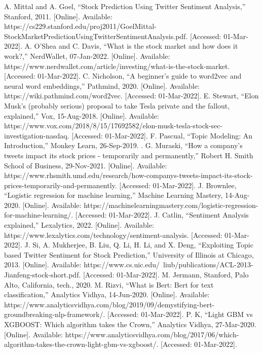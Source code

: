 \documentclass[conference]{IEEEtran}
\begin{document}
\begin{thebibliography}{00}
     A. Mittal and A. Goel, “Stock Prediction Using Twitter Sentiment Analysis,” Stanford, 2011. [Online]. Available: https://cs229.stanford.edu/proj2011/GoelMittal-StockMarketPredictionUsingTwitterSentimentAnalysis.pdf. [Accessed: 01-Mar-2022].
     A. O'Shea and C. Davis, “What is the stock market and how does it work?,” NerdWallet, 07-Jan-2022. [Online]. Available: https://www.nerdwallet.com/article/investing/what-is-the-stock-market. [Accessed: 01-Mar-2022].
     C. Nicholson, “A beginner's guide to word2vec and neural word embeddings,” Pathmind, 2020. [Online]. Available: https://wiki.pathmind.com/word2vec. [Accessed: 01-Mar-2022].
     E. Stewart, “Elon Musk's (probably serious) proposal to take Tesla private and the fallout, explained,” Vox, 15-Aug-2018. [Online]. Available: https://www.vox.com/2018/8/15/17692582/elon-musk-tesla-stock-sec-investigation-nasdaq. [Accessed: 01-Mar-2022].
     F. Pascual, “Topic Modeling: An Introduction,” Monkey Learn, 26-Sep-2019. .
     G. Muraski, “How a company's tweets impact its stock prices - temporarily and permanently,” Robert H. Smith School of Business, 29-Nov-2021. [Online]. Available: https://www.rhsmith.umd.edu/research/how-companys-tweets-impact-its-stock-prices-temporarily-and-permanently. [Accessed: 01-Mar-2022].
     J. Brownlee, “Logistic regression for machine learning,” Machine Learning Mastery, 14-Aug-2020. [Online]. Available: https://machinelearningmastery.com/logistic-regression-for-machine-learning/. [Accessed: 01-Mar-2022].
     J. Catlin, “Sentiment Analysis explained,” Lexalytics, 2022. [Online]. Available: https://www.lexalytics.com/technology/sentiment-analysis. [Accessed: 01-Mar-2022].
     J. Si, A. Mukherjee, B. Liu, Q. Li, H. Li, and X. Deng, “Exploiting Topic based Twitter Sentiment for Stock Prediction,” University of Illinois at Chicago, 2013. [Online]. Available: https://www.cs.uic.edu/~liub/publications/ACL-2013-Jianfeng-stock-short.pdf. [Accessed: 01-Mar-2022].
     M. Jermann, Stanford, Palo Alto, California, tech., 2020.
     M. Rizvi, “What is Bert: Bert for text classification,” Analytics Vidhya, 14-Jun-2020. [Online]. Available: https://www.analyticsvidhya.com/blog/2019/09/demystifying-bert-groundbreaking-nlp-framework/. [Accessed: 01-Mar-2022].
     P. K, “Light GBM vs XGBOOST: Which algorithm takes the Crown,” Analytics Vidhya, 27-Mar-2020. [Online]. Available: https://www.analyticsvidhya.com/blog/2017/06/which-algorithm-takes-the-crown-light-gbm-vs-xgboost/. [Accessed: 01-Mar-2022].

\end{thebibliography}
\end{document}
